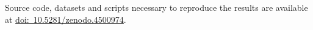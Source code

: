 \documentclass[sigconf,dvipsnames]{acmart}
\newcommand{\supplement}{\href{http://doi.org/10.5281/zenodo.4500974}{doi:~10.5281/zenodo.4500974}}
\begin{document}

 Source code, datasets and scripts necessary to reproduce the results are available at \supplement.
%



\end{document}
